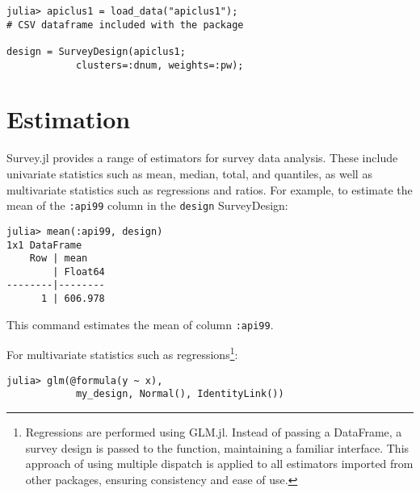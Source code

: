 \documentclass{juliacon}
\begin{document}
\begin{lstlisting}
julia> apiclus1 = load_data("apiclus1"); 
# CSV dataframe included with the package

design = SurveyDesign(apiclus1; 
            clusters=:dnum, weights=:pw);
    \end{lstlisting}


\section{Estimation}

Survey.jl provides a range of estimators for survey data analysis. These include univariate statistics such as mean, median, total, and quantiles, as well as multivariate statistics such as regressions and ratios. For example, to estimate the mean of the \verb|:api99| column in the \verb|design| SurveyDesign:

\begin{lstlisting}
julia> mean(:api99, design)
1x1 DataFrame
    Row | mean    
        | Float64 
--------|--------
      1 | 606.978
    \end{lstlisting}
This command estimates the mean of column \verb|:api99|.

For multivariate statistics such as regressions\footnote{Regressions are performed using GLM.jl. Instead of passing a DataFrame, a survey design is passed to the function, maintaining a familiar interface. This approach of using multiple dispatch is applied to all estimators imported from other packages, ensuring consistency and ease of use.}:

\begin{lstlisting}
julia> glm(@formula(y ~ x),
            my_design, Normal(), IdentityLink())
\end{lstlisting}
\end{document}
